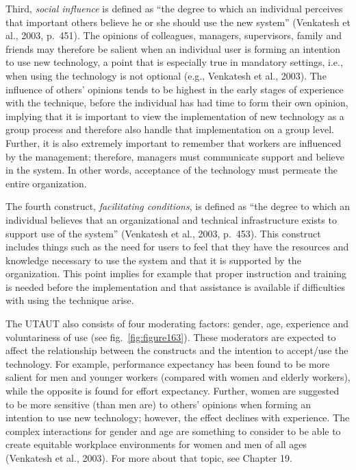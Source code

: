 \documentclass[
  12pt,
]{scrbook}
\begin{document}
Third, \emph{social influence} is defined as ``the degree to which an individual perceives that important others believe he or she should use the new system'' (Venkatesh et al., 2003, p.~451). The opinions of colleagues, managers, supervisors, family and friends may therefore be salient when an individual user is forming an intention to use new technology, a point that is especially true in mandatory settings, i.e., when using the technology is not optional (e.g., Venkatesh et al., 2003). The influence of others' opinions tends to be highest in the early stages of experience with the technique, before the individual has had time to form their own opinion, implying that it is important to view the implementation of new technology as a group process and therefore also handle that implementation on a group level. Further, it is also extremely important to remember that workers are influenced by the management; therefore, managers must communicate support and believe in the system. In other words, acceptance of the technology must permeate the entire organization.

The fourth construct, \emph{facilitating conditions}, is defined as ``the degree to which an individual believes that an organizational and technical infrastructure exists to support use of the system'' (Venkatesh et al., 2003, p.~453). This construct includes things such as the need for users to feel that they have the resources and knowledge necessary to use the system and that it is supported by the organization. This point implies for example that proper instruction and training is needed before the implementation and that assistance is available if difficulties with using the technique arise.~

The UTAUT also consists of four moderating factors: gender, age, experience and voluntariness of use (see fig.~\ref{fig:figure163}). These moderators are expected to affect the relationship between the constructs and the intention to accept/use the technology. For example, performance expectancy has been found to be more salient for men and younger workers (compared with women and elderly workers), while the opposite is found for effort expectancy. Further, women are suggested to be more sensitive (than men are) to others' opinions when forming an intention to use new technology; however, the effect declines with experience. The complex interactions for gender and age are something to consider to be able to create equitable workplace environments for women and men of all ages (Venkatesh et al., 2003). For more about that topic, see Chapter 19.
\end{document}
